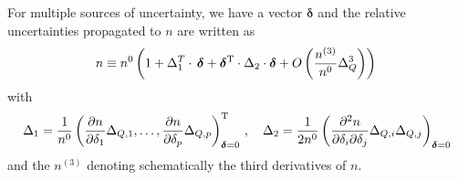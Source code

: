 \documentclass[11pt]{article}
\newcommand{\be}{\begin{equation}}
\newcommand{\ee}{\end{equation}}
\begin{document}
For multiple sources of uncertainty, we have a vector $\boldsymbol{\delta}$ and the relative uncertainties propagated to $n$ are written as
\be n\equiv n^{0}\left( 1+ \Delta_{1}^T\cdot \, \boldsymbol{\delta}+\boldsymbol{\delta}^{\rm T}\cdot\Delta_{2} \cdot \boldsymbol{\delta} +O\left(\frac{n^{(3)}}{n^{0}}\Delta_Q^3\right)
\right)\,
\label{eq:propmult}
\ee
with
\be
\Delta_1=\frac{1}{n^{0}}\left(\frac{\partial n }{\partial \delta_{1}}\Delta_{Q,1},\ldots,
\frac{ \partial n }{\partial \delta_{p}}\Delta_{Q,p} \right)_{\boldsymbol{\delta}=0}^{\rm T} \,, \label{eq:stdDelta1} \quad \Delta_2=\frac{1}{2n^{0}}\left(\frac{\partial^2 n}{\partial \delta_{i}\partial \delta_{j}}\Delta_{Q,i}\Delta_{Q,j}  \right)_{\boldsymbol{\delta}=0} 
\ee
and the $n^{(3)}$ denoting schematically the third derivatives of $n$.

\end{document}
